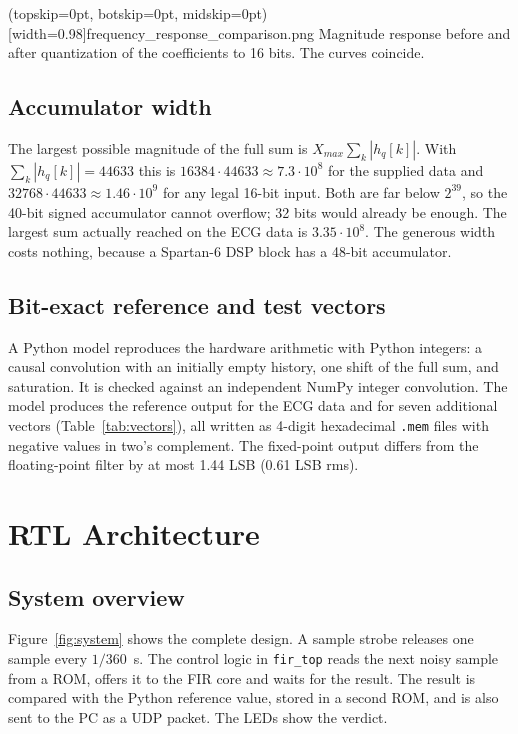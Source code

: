 \documentclass{ieeeaccess}
\begin{document}
\Figure[t!](topskip=0pt, botskip=0pt, midskip=0pt)[width=0.98\columnwidth]{frequency_response_comparison.png}
{Magnitude response before and after quantization of the coefficients to 16 bits. The curves coincide.\label{fig:cmp}}

\subsection{Accumulator width}
The largest possible magnitude of the full sum is $X_{max}\sum_k |h_q[k]|$. With $\sum_k|h_q[k]| = 44633$ this is $16384\cdot44633 \approx 7.3\cdot10^{8}$ for the supplied data and $32768\cdot 44633 \approx 1.46\cdot10^{9}$ for any legal 16-bit input. Both are far below $2^{39}$, so the 40-bit signed accumulator cannot overflow; 32 bits would already be enough. The largest sum actually reached on the ECG data is $3.35\cdot10^{8}$. The generous width costs nothing, because a Spartan-6 DSP block has a 48-bit accumulator.

\subsection{Bit-exact reference and test vectors}
A Python model reproduces the hardware arithmetic with Python integers: a causal convolution with an initially empty history, one shift of the full sum, and saturation. It is checked against an independent NumPy integer convolution. The model produces the reference output for the ECG data and for seven additional vectors (Table~\ref{tab:vectors}), all written as 4-digit hexadecimal \texttt{.mem} files with negative values in two's complement. The fixed-point output differs from the floating-point filter by at most 1.44 LSB (0.61 LSB rms).

\section{RTL Architecture}
\label{sec:rtl}
\subsection{System overview}
Figure~\ref{fig:system} shows the complete design. A sample strobe releases one sample every $1/360$~s. The control logic in \texttt{fir\_top} reads the next noisy sample from a ROM, offers it to the FIR core and waits for the result. The result is compared with the Python reference value, stored in a second ROM, and is also sent to the PC as a UDP packet. The LEDs show the verdict.
\end{document}

